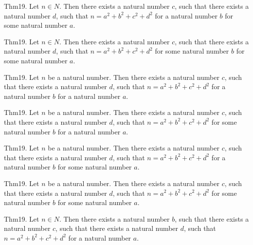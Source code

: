 \documentclass{article}
\begin{document}
Thm19. Let $n \in N$. Then there exists a natural number $c$, such that there exists a natural number $d$, such that $n = a ^{ 2}+ b ^{ 2}+ c ^{ 2}+ d ^{ 2}$ for a natural number $b$ for some natural number $a$.

Thm19. Let $n \in N$. Then there exists a natural number $c$, such that there exists a natural number $d$, such that $n = a ^{ 2}+ b ^{ 2}+ c ^{ 2}+ d ^{ 2}$ for some natural number $b$ for some natural number $a$.

Thm19. Let $n$ be a natural number. Then there exists a natural number $c$, such that there exists a natural number $d$, such that $n = a ^{ 2}+ b ^{ 2}+ c ^{ 2}+ d ^{ 2}$ for a natural number $b$ for a natural number $a$.

Thm19. Let $n$ be a natural number. Then there exists a natural number $c$, such that there exists a natural number $d$, such that $n = a ^{ 2}+ b ^{ 2}+ c ^{ 2}+ d ^{ 2}$ for some natural number $b$ for a natural number $a$.

Thm19. Let $n$ be a natural number. Then there exists a natural number $c$, such that there exists a natural number $d$, such that $n = a ^{ 2}+ b ^{ 2}+ c ^{ 2}+ d ^{ 2}$ for a natural number $b$ for some natural number $a$.

Thm19. Let $n$ be a natural number. Then there exists a natural number $c$, such that there exists a natural number $d$, such that $n = a ^{ 2}+ b ^{ 2}+ c ^{ 2}+ d ^{ 2}$ for some natural number $b$ for some natural number $a$.

Thm19. Let $n \in N$. Then there exists a natural number $b$, such that there exists a natural number $c$, such that there exists a natural number $d$, such that $n = a ^{ 2}+ b ^{ 2}+ c ^{ 2}+ d ^{ 2}$ for a natural number $a$.
\end{document}
